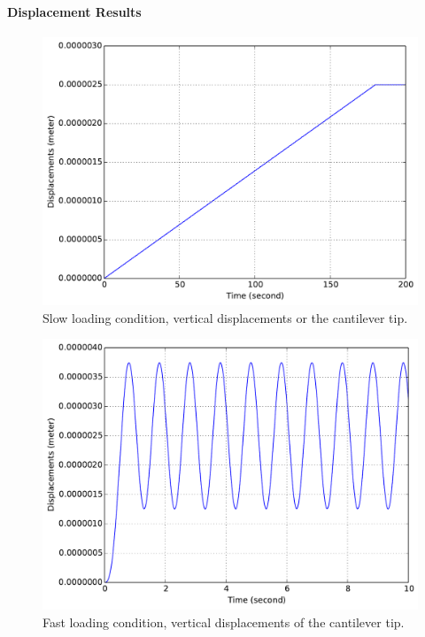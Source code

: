 \documentclass[fleqn,11pt]{article}
\begin{document}
\paragraph{Displacement Results} 

\begin{figure}[!htb]
  \centering
  \includegraphics[width=12cm]{../Figure-files/_Chapter_Appendix_Illustrative_Examples/beam-1element-slowLoading.pdf}
  \caption{Slow loading condition, vertical displacements or the cantilever tip.}
  \label{fig_beam1_slow}
\end{figure}


\begin{figure}[!htb]
  \centering
  \includegraphics[width=12cm]{../Figure-files/_Chapter_Appendix_Illustrative_Examples/beam-1element-fastLoading.pdf}
  \caption{Fast loading condition, vertical displacements of the cantilever tip.}
  \label{fig_beam1_fast}
\end{figure}
\end{document}

